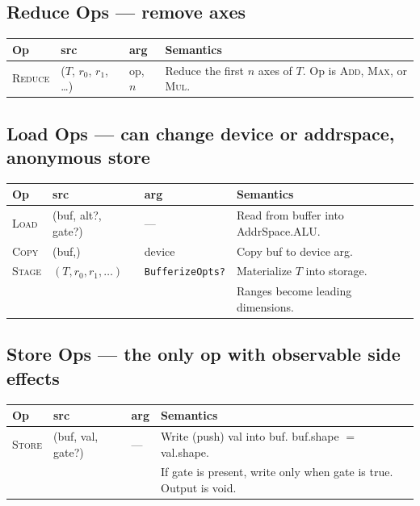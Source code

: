 \documentclass[10pt,letterpaper]{article}
\newcommand{\op}[1]{\textsc{#1}}
\begin{document}
\subsection*{{\color{reducered}Reduce Ops} \normalfont\small--- remove axes}

\begin{tabular}{@{}l l l l@{}}
\toprule
\textbf{Op} & \textbf{src} & \textbf{arg} & \textbf{Semantics} \\
\midrule
\op{Reduce} & ($T$, $r_0$, $r_1$, \ldots) & op, $n$ & Reduce the first $n$ axes of $T$. Op is \op{Add}, \op{Max}, or \op{Mul}. \\
\bottomrule
\end{tabular}

\subsection*{{\color{loadred}Load Ops} \normalfont\small--- can change device or addrspace, anonymous store}

\begin{tabular}{@{}l l l l@{}}
\toprule
\textbf{Op} & \textbf{src} & \textbf{arg} & \textbf{Semantics} \\
\midrule
\op{Load} & (buf, alt?, gate?) & --- & Read from buffer into AddrSpace.ALU. \\
\op{Copy} & (buf,) & device & Copy buf to device arg. \\
\op{Stage} & $(T, r_0, r_1, \ldots)$ & \texttt{BufferizeOpts?} & Materialize $T$ into storage. \\
  & & & Ranges become leading dimensions. \\
\bottomrule
\end{tabular}

\subsection*{{\color{multipurple}Store Ops} \normalfont\small--- the only op with observable side effects}

\begin{tabular}{@{}l l l l@{}}
\toprule
\textbf{Op} & \textbf{src} & \textbf{arg} & \textbf{Semantics} \\
\midrule
\op{Store} & (buf, val, gate?) & --- & Write (push) val into buf. buf.shape $=$ val.shape. \\
  & & & If gate is present, write only when gate is true. Output is void. \\
\bottomrule
\end{tabular}
\end{document}
